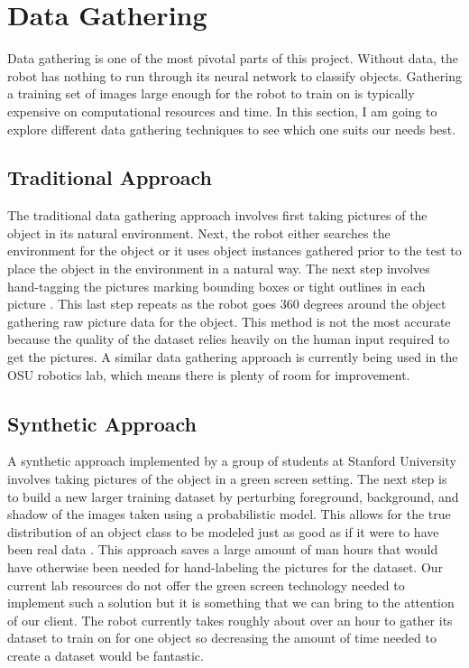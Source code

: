 \documentclass[draftclsnofoot, onecolumn, 10pt, compsoc]{IEEEtran}
\begin{document}
\section{Data Gathering}
Data gathering is one of the most pivotal parts of this project. Without data, the robot has nothing to run through its neural network to classify objects.  Gathering a training set of images large enough for the robot to train on is typically expensive on computational resources and time. In this section, I am going to explore different data gathering techniques to see which one suits our needs best. 
\subsection{Traditional Approach}
The traditional data gathering approach involves first taking pictures of the object in its natural environment. Next, the robot either searches the environment for the object or it uses object instances gathered prior to the test to place the object in the environment in a natural way. The next step involves hand-tagging the pictures marking bounding boxes or tight outlines in each picture \cite{ Datastanford}. This last step repeats as the robot goes 360 degrees around the object gathering raw picture data for the object. This method is not the most accurate because the quality of the dataset relies heavily on the human input required to get the pictures. A similar data gathering approach is currently being used in the OSU robotics lab, which means there is plenty of room for improvement.
\subsection{Synthetic Approach}
A synthetic approach implemented by a group of students at Stanford University involves taking pictures of the object in a green screen setting. The next step is to build a new larger training dataset by perturbing foreground, background, and shadow of the images taken using a probabilistic model. This allows for the true distribution of an object class to be modeled just as good as if it were to have been real data \cite{ Datastanford}. This approach saves a large amount of man hours that would have otherwise been needed for hand-labeling the pictures for the dataset. Our current lab resources do not offer the green screen technology needed to implement such a solution but it is something that we can bring to the attention of our client. The robot currently takes roughly about over an hour to gather its dataset to train on for one object so decreasing the amount of time needed to create a dataset would be fantastic.
\end{document}
